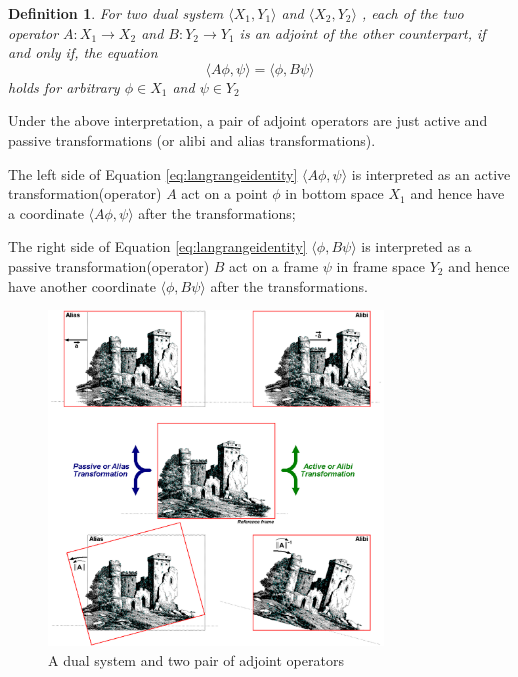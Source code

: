 \documentclass{article}
\newtheorem{definition}{Definition}
\begin{document}
\begin{definition}
\label{d1}
For two dual system $ \langle X_1, Y_1 \rangle $ and $ \langle X_2, Y_2 \rangle $ , each of the two operator $ A : X_1 \to X_2$ and $ B : Y_2 \to Y_1 $ is an adjoint of the other counterpart,
if and only if, the equation
\begin{equation}
  \label{eq:langrangeidentity}
  \langle A \phi, \psi \rangle = \langle \phi, B \psi \rangle
\end{equation}
holds for arbitrary $ \phi \in X_1 $ and $ \psi \in Y_2 $
\end{definition}

Under the above interpretation, a pair of adjoint operators are just active and passive transformations (or alibi and alias transformations)\cite{wiki:aptrans}.

The left side of Equation \ref{eq:langrangeidentity} $ \langle A \phi, \psi \rangle $ is interpreted as an active transformation(operator) $ A $ act on a point $\phi$ in bottom space $ X_1 $ and hence have a coordinate $\langle A \phi, \psi \rangle$ after the transformations;

The right side of Equation \ref{eq:langrangeidentity} $ \langle \phi, B \psi \rangle $ is interpreted as a passive transformation(operator) $ B $ act on a frame $\psi$ in frame space $ Y_2 $ and hence have another coordinate $\langle \phi, B \psi \rangle$ after the transformations.

\begin{figure}[ht]
\label{fig:alias_and_alibi}
\centering
\includegraphics[width=3.5in]{../images/adjoint/alias_and_alibi.png}
\caption{A dual system and two pair of adjoint operators\cite{wiki:aatrans}}
\end{figure}
\end{document}
